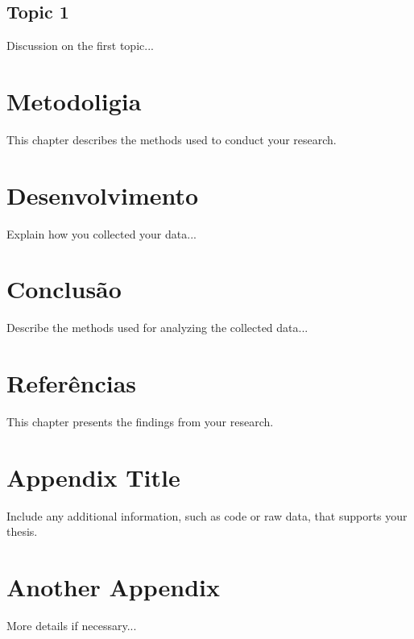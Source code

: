 \documentclass[12pt, a4paper]{report} %
\begin{document}
\section{Topic 1}
Discussion on the first topic...

\chapter{Metodoligia}
This chapter describes the methods used to conduct your research.

\chapter{Desenvolvimento}
Explain how you collected your data...

\chapter{Conclusão}
Describe the methods used for analyzing the collected data...

\chapter{Referências}
This chapter presents the findings from your research.

\appendix
\chapter{Appendix Title}
Include any additional information, such as code or raw data, that supports your thesis.

\chapter{Another Appendix}
More details if necessary...

\newpage
\printbibliography
\end{document}
